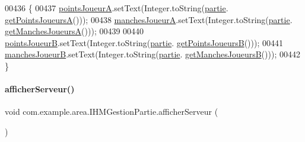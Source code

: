 \begin{DoxyCode}
00436     \{
00437         \hyperlink{classcom_1_1example_1_1area_1_1_i_h_m_gestion_partie_affa1414152ba72b6b19e087049e2bda8}{pointsJoueurA}.setText(Integer.toString(\hyperlink{classcom_1_1example_1_1area_1_1_i_h_m_gestion_partie_a225e150f813f8fa5c632709a57eacc32}{partie}.
      \hyperlink{classcom_1_1example_1_1area_1_1_partie_a5ec15306fc24648c1698ea0cdd50bf53}{getPointsJoueursA}()));
00438         \hyperlink{classcom_1_1example_1_1area_1_1_i_h_m_gestion_partie_ac30dccc72d814c0d1eb36aeb5f5bdc1f}{manchesJoueurA}.setText(Integer.toString(\hyperlink{classcom_1_1example_1_1area_1_1_i_h_m_gestion_partie_a225e150f813f8fa5c632709a57eacc32}{partie}.
      \hyperlink{classcom_1_1example_1_1area_1_1_partie_a7c863edbbdd07ddc7f71616949823201}{getManchesJoueursA}()));
00439 
00440         \hyperlink{classcom_1_1example_1_1area_1_1_i_h_m_gestion_partie_a88e51101924801095d21f65d16b337f3}{pointsJoueurB}.setText(Integer.toString(\hyperlink{classcom_1_1example_1_1area_1_1_i_h_m_gestion_partie_a225e150f813f8fa5c632709a57eacc32}{partie}.
      \hyperlink{classcom_1_1example_1_1area_1_1_partie_a376bb79a67c311e1eb681387e9440bbd}{getPointsJoueursB}()));
00441         \hyperlink{classcom_1_1example_1_1area_1_1_i_h_m_gestion_partie_ae60c32d48a9fe634358fae66d760a573}{manchesJoueurB}.setText(Integer.toString(\hyperlink{classcom_1_1example_1_1area_1_1_i_h_m_gestion_partie_a225e150f813f8fa5c632709a57eacc32}{partie}.
      \hyperlink{classcom_1_1example_1_1area_1_1_partie_a706fa101c4fcad9f2ea6473b5778b55e}{getManchesJoueursB}()));
00442     \}
\end{DoxyCode}
\mbox{\label{classcom_1_1example_1_1area_1_1_i_h_m_gestion_partie_adf8fc8de224da80f542675cbb4c2e364}} 
\paragraph{\texorpdfstring{afficher\+Serveur()}{afficherServeur()}}
{\footnotesize\ttfamily void com.\+example.\+area.\+I\+H\+M\+Gestion\+Partie.\+afficher\+Serveur (\begin{DoxyParamCaption}{ }\end{DoxyParamCaption})\hspace{0.3cm}{\ttfamily [private]}}



